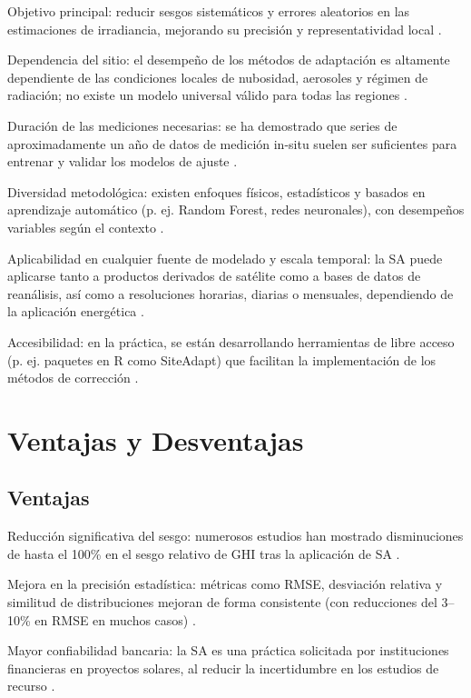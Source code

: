 Objetivo principal: reducir sesgos sistemáticos y errores aleatorios en las estimaciones de irradiancia, mejorando su precisión y representatividad local \citep{POLO2020, Fernández2020}.

Dependencia del sitio: el desempeño de los métodos de adaptación es altamente dependiente de las condiciones locales de nubosidad, aerosoles y régimen de radiación; no existe un modelo universal válido para todas las regiones \citep{ZAINALI2024}.

Duración de las mediciones necesarias: se ha demostrado que series de aproximadamente un año de datos de medición in-situ suelen ser suficientes para entrenar y validar los modelos de ajuste \citep{POLO2020, ZAINALI2024}.

Diversidad metodológica: existen enfoques físicos, estadísticos y basados en aprendizaje automático (p. ej. Random Forest, redes neuronales), con desempeños variables según el contexto \citep{BABAR2020, NARVAEZ2021}.

Aplicabilidad en cualquier fuente de modelado y escala temporal: la SA puede aplicarse tanto a productos derivados de satélite como a bases de datos de reanálisis, así como a resoluciones horarias, diarias o mensuales, dependiendo de la aplicación energética \citep{Fernández2020, Quansah2024}.

Accesibilidad: en la práctica, se están desarrollando herramientas de libre acceso (p. ej. paquetes en R como SiteAdapt) que facilitan la implementación de los métodos de corrección \citep{Fernández2020}.


\section{Ventajas y Desventajas}

\subsection*{Ventajas}

Reducción significativa del sesgo: numerosos estudios han mostrado disminuciones de hasta el 100\% en el sesgo relativo de GHI tras la aplicación de SA \citep{BABAR2020,  SALAMALIKIS2022}.

Mejora en la precisión estadística: métricas como RMSE, desviación relativa y similitud de distribuciones mejoran de forma consistente (con reducciones del 3–10\% en RMSE en muchos casos) \citep{Fernández2020, ZAINALI2024}.

Mayor confiabilidad bancaria: la SA es una práctica solicitada por instituciones financieras en proyectos solares, al reducir la incertidumbre en los estudios de recurso \citep{Fernández2020}.

